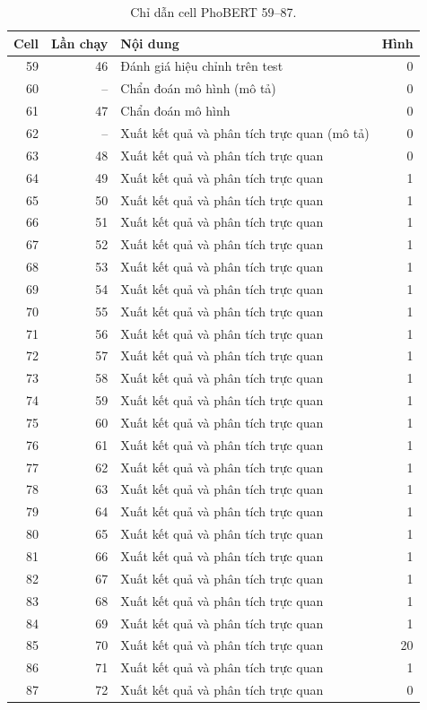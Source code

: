 \begin{table}[H]\centering\small\caption{Chỉ dẫn cell PhoBERT 59--87.}
\begin{tabular}{r r p{87mm} r}\toprule Cell & Lần chạy & Nội dung & Hình\\\midrule
59 & 46 & Đánh giá hiệu chỉnh trên test & 0\\
60 & -- & Chẩn đoán mô hình (mô tả) & 0\\
61 & 47 & Chẩn đoán mô hình & 0\\
62 & -- & Xuất kết quả và phân tích trực quan (mô tả) & 0\\
63 & 48 & Xuất kết quả và phân tích trực quan & 0\\
64 & 49 & Xuất kết quả và phân tích trực quan & 1\\
65 & 50 & Xuất kết quả và phân tích trực quan & 1\\
66 & 51 & Xuất kết quả và phân tích trực quan & 1\\
67 & 52 & Xuất kết quả và phân tích trực quan & 1\\
68 & 53 & Xuất kết quả và phân tích trực quan & 1\\
69 & 54 & Xuất kết quả và phân tích trực quan & 1\\
70 & 55 & Xuất kết quả và phân tích trực quan & 1\\
71 & 56 & Xuất kết quả và phân tích trực quan & 1\\
72 & 57 & Xuất kết quả và phân tích trực quan & 1\\
73 & 58 & Xuất kết quả và phân tích trực quan & 1\\
74 & 59 & Xuất kết quả và phân tích trực quan & 1\\
75 & 60 & Xuất kết quả và phân tích trực quan & 1\\
76 & 61 & Xuất kết quả và phân tích trực quan & 1\\
77 & 62 & Xuất kết quả và phân tích trực quan & 1\\
78 & 63 & Xuất kết quả và phân tích trực quan & 1\\
79 & 64 & Xuất kết quả và phân tích trực quan & 1\\
80 & 65 & Xuất kết quả và phân tích trực quan & 1\\
81 & 66 & Xuất kết quả và phân tích trực quan & 1\\
82 & 67 & Xuất kết quả và phân tích trực quan & 1\\
83 & 68 & Xuất kết quả và phân tích trực quan & 1\\
84 & 69 & Xuất kết quả và phân tích trực quan & 1\\
85 & 70 & Xuất kết quả và phân tích trực quan & 20\\
86 & 71 & Xuất kết quả và phân tích trực quan & 1\\
87 & 72 & Xuất kết quả và phân tích trực quan & 0\\
\bottomrule\end{tabular}\end{table}
